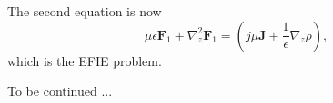 \documentclass{article}
\theoremstyle{plain}
\begin{document}
The second equation is now
\begin{equation}
	\mu\epsilon\mathbf{F}_1 + \nabla_z^2\mathbf{F}_1 = \left( j\mu\mathbf{J} + \frac{1}{\epsilon}\nabla_z\rho \right),
\end{equation}
which is the EFIE problem.

To be continued ...
\end{document}
